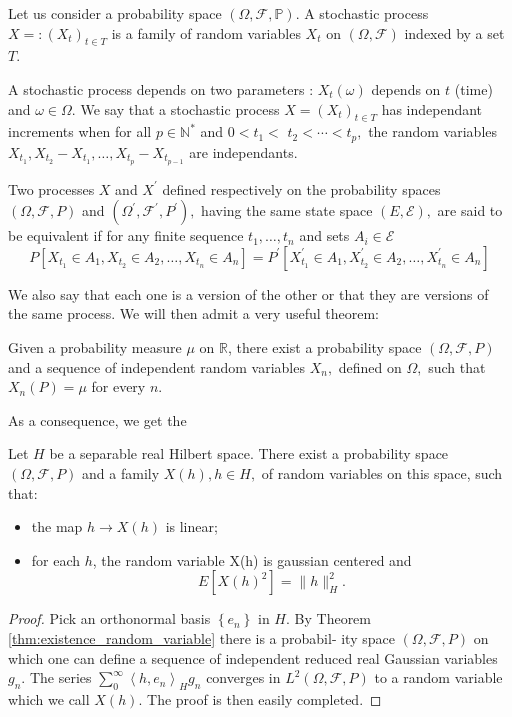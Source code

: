 \begin{definition}
	Let us consider a probability space $(\Omega,\mathscr{F}, \mathbb{P})$. A stochastic process  $X=:\left(X_{t}\right)_{t \in T}$ is a family of random variables $X_{t}$ on $(\Omega,\mathscr{F})$ indexed by a set $T$.

	A stochastic process depends on two parameters : $X_{t}(\omega)$ depends on $t$ (time) and $\omega \in \Omega$.
	We say that a stochastic process $X=\left(X_{t}\right)_{t \in T}$ has independant increments when for all $p \in \mathbb{N}^{*} $ and $0<t_{1}<$
	$t_{2}<\cdots<t_{p},$ the random variables $X_{t_{1}}, X_{t_{2}}-X_{t_{1}}, \ldots, X_{t_{p}}-X_{t_{p-1}}$ are independants.
\end{definition}
\begin{definition}
	Two processes $X$ and $X^{\prime}$ defined respectively on the probability spaces $(\Omega, \mathscr{F}, P)$ and $\left(\Omega^{\prime}, \mathcal{F}^{\prime}, P^{\prime}\right),$ having the same state space $(E, \mathscr{E}),$ are said
	to be equivalent if for any finite sequence $t_{1}, \ldots, t_{n}$ and sets $A_{i} \in \mathscr{E}$
	\[
	P\left[X_{t_{1}} \in A_{1}, X_{t_{2}} \in A_{2}, \ldots, X_{t_{n}} \in A_{n}\right]=P^{\prime}\left[X_{t_{1}}^{\prime} \in A_{1}, X_{t_{2}}^{\prime} \in A_{2}, \ldots, X_{t_{n}}^{\prime} \in A_{n}\right]
	\]
\end{definition}
We also say that each one is a version of the other or that they are versions of the same process.
We will then admit a very useful theorem:
\begin{theorem}\label{thm:existence_random_variable}
	Given a probability measure $\mu$ on $\mathbb{R}$, there exist a probability
	space $(\Omega, \mathscr{F}, P)$ and a sequence of independent random variables $X_{n},$ defined on
	$\Omega,$ such that $X_{n}(P)=\mu$ for every $n .$
\end{theorem}
As a consequence, we get the
\begin{proposition}
	Let $H$ be a separable real Hilbert space. There exist a probability space $(\Omega, \mathscr{F}, P)$ and a family $X(h), h \in H,$ of random variables on this space, such that:
	\begin{itemize}
		\item the map $h\rightarrow X(h)$ is linear;
		\item for each $h$, the random variable X(h) is gaussian centered and
		$$
		E\left[X(h)^{2}\right]=\|h\|_{H}^{2} .
		$$
	\end{itemize}

\end{proposition}
\begin{proof}
	 Pick an orthonormal basis $\left\{e_{n}\right\}$ in $H .$ By Theorem \eqref{thm:existence_random_variable} there is a probabil-
	ity space $(\Omega, \mathscr{F}, P)$ on which one can define a sequence of independent reduced
	real Gaussian variables $g_{n} .$ The series $\sum_{0}^{\infty}\left\langle h, e_{n}\right\rangle_{H} g_{n}$ converges in $L^{2}(\Omega, \mathscr{F}, P)$
	to a random variable which we call $X(h) .$ The proof is then easily completed.

\end{proof}

